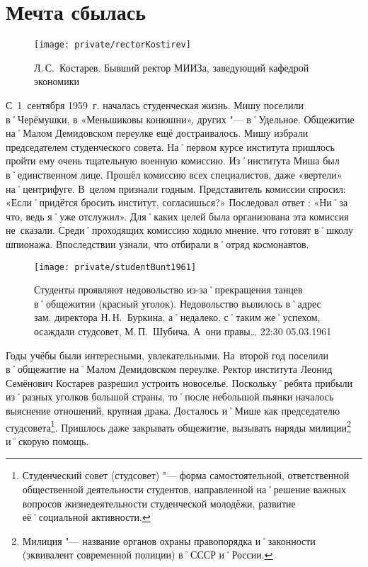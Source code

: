 ﻿\chapter{Мечта сбылась}

\begin{wrapfigure}{O}{.4\textwidth}
\centering
\texttt{[image: private/rectorKostirev]}
\caption[Л.\,С.~Костарев. Бывший ректор МИИЗа, заведующий кафедрой экономики]{Л.\,С.~Костарев. Бывший ректор МИИЗа, заведующий кафедрой экономики\footnotemark}
\label{fig:rectorKostirev}
\end{wrapfigure}

С~1~сентября 1959~г. началась студенческая жизнь. Мишу поселили в˚Черёмушки, в «Меньшиковы конюшни», других "--- в˚Удельное. Общежитие на˚Малом Демидовском переулке ещё достраивалось. Мишу избрали председателем студенческого совета. На˚первом курсе института пришлось пройти ему очень тщательную военную комиссию. Из˚института Миша был в˚единственном лице. Прошёл комиссию всех специалистов, даже «вертели» на˚центрифуге. В~целом признали годным. Представитель комиссии спросил: «Если˚придётся бросить институт, согласишься?» Последовал ответ : «Ни˚за что, ведь я˚уже отслужил». Для˚каких целей была организована эта комиссия не~сказали. Среди˚проходящих комиссию ходило мнение, что готовят в˚школу шпионажа. Впоследствии узнали, что отбирали в˚отряд космонавтов.

\begin{figure}[h!]
\texttt{[image: private/studentBunt1961]}
\caption[Студенты проявляют недовольство из-за˚прекращения танцев в˚общежитии (красный уголок). Недовольство вылилось в˚адрес зам. директора Н.\,Н.~Буркина, а˚недалеко, с˚таким же˚успехом, осаждали студсовет, М.\,П.~Шубича. А~они правы… 22:30 05.03.1961]{Студенты проявляют недовольство из-за˚прекращения танцев в˚общежитии (красный уголок). Недовольство вылилось в˚адрес зам. директора Н.\,Н.~Буркина, а˚недалеко, с˚таким же˚успехом, осаждали студсовет, М.\,П.~Шубича. А~они правы… 22:30 05.03.1961\footnotemark}
\label{fig:studentBunt1961}
\end{figure}

Годы учёбы были интересными, увлекательными. На~второй год поселили в˚общежитие на˚Малом Демидовском переулке. Ректор института Леонид Семёнович Костарев разрешил устроить новоселье. Поскольку˚ребята прибыли из˚разных уголков большой страны, то˚после небольшой пьянки началось выяснение отношений, крупная драка. Досталось и˚Мише как председателю студсовета\footnote{Студенческий совет (студсовет) "--- форма самостоятельной, ответственной общественной деятельности студентов, направленной на˚решение важных вопросов жизнедеятельности студенческой молодёжи, развитие её˚социальной активности.}. Пришлось даже закрывать общежитие, вызывать наряды милиции\footnote{Милиция "--- название органов охраны правопорядка и˚законности (эквивалент современной полиции) в˚СССР и˚России.} и˚скорую помощь.

